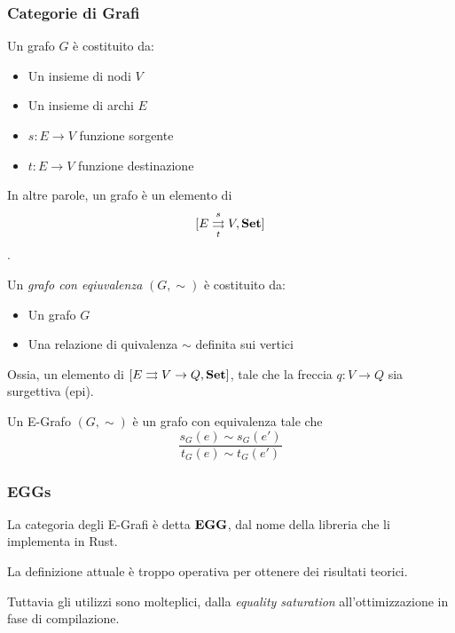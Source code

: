 \documentclass[8pt]{beamer}
\begin{document}
\begin{frame}[fragile]\frametitle{Categorie di Grafi}
	
	\begin{wrapfigure}{R}{0.4\textwidth}
	\end{wrapfigure}
	
	Un grafo $G$ è costituito da:
	\begin{itemize}
		\item Un insieme di nodi $V$
		\item Un insieme di archi $E$
		\item $s: E \to V$ funzione sorgente
		\item $t: E \to V$ funzione destinazione
	\end{itemize}
	In altre parole, un grafo è un elemento di $$[E \mathrel{\mathop{\rightrightarrows}^{s}_{t}} V , \mathbf{Set}]$$.

	Un \emph{grafo con eqiuvalenza} $(G, \sim)$ è costituito da:
	\begin{itemize}
		\item Un grafo $G$
		\item Una relazione di quivalenza $\sim$ definita sui vertici
	\end{itemize}
	Ossia, un elemento di $[E \rightrightarrows V \to Q, \mathbf{Set}]$, tale che la freccia $q: V \to Q$ sia surgettiva (epi).

	Un E-Grafo $(G, \sim)$ è un grafo con equivalenza tale che
	\[
		\frac{s_G(e)\sim s_G(e')}{t_G(e) \sim t_G(e')}
	\]
\end{frame}

\begin{frame}\frametitle{EGGs}

			

	La categoria degli E-Grafi è detta $\mathbf{EGG}$, dal nome della libreria che li implementa in Rust.

	\smallskip

	La definizione attuale è troppo operativa per ottenere dei risultati teorici.

	\smallskip

	Tuttavia gli utilizzi sono molteplici, dalla \emph{equality saturation} all'ottimizzazione in fase di compilazione.
\end{frame}
\end{document}
